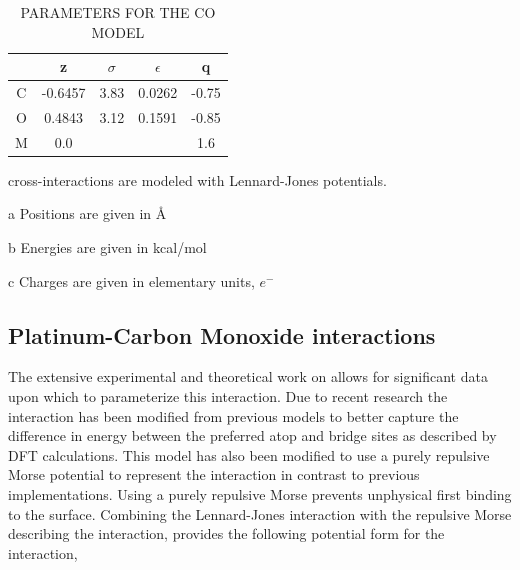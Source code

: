 \begin{table}
\caption{PARAMETERS FOR THE CO MODEL}
\centering
\begin{threeparttable}
\centering
\begin{tabular}{c c c c c}
\hline
\hline
 & z \tnote{a} & $\sigma$ \tnote{a} & $\epsilon$ \tnote{b} & q \tnote{c}\\
 \hline
 C & -0.6457 & 3.83 & 0.0262 & -0.75 \\
 O & 0.4843 & 3.12 & 0.1591 & -0.85 \\
 M & 0.0 & & & 1.6 \\
\hline
\hline
 \end{tabular}
\begin{tablenotes}
  \item {} cross-interactions are modeled with Lennard-Jones potentials.
  \item[a] Positions are given in \AA
  \item[b] Energies are given in kcal/mol
  \item[c] Charges are given in elementary units, $e^{-}$
\end{tablenotes}
\end{threeparttable}
\label{tab:parameters}
\end{table}

\subsection{Platinum-Carbon Monoxide interactions}
The extensive experimental \citep{Yeo:1997th, Ertl:1977cg, Kelemen:1979ad,
?,?,?} and theoretical \citep{Deshlahra:2012aa, Korzeniewski:1986kl,
Beurden:2002ys, Deshlahra:2009wu, Feibelman:2001qa, Mason:2004ix} work on
 allows for significant data upon which to parameterize this
interaction.  Due to recent research the  interaction has been
modified from previous models\citep{Michalka:2013aa, Michalka:2015aa} to better
capture the difference in energy between the preferred atop and bridge
sites as described by DFT calculations.\citep{Deshlahra:2012aa} This model has
also been modified to use a purely repulsive Morse potential to represent the
 interaction in contrast to previous
implementations.\citep{Korzeniewski:1986kl, Michalka:2013aa} Using a purely
repulsive Morse prevents unphysical  first binding to the surface.
Combining the Lennard-Jones  interaction with the repulsive
Morse describing the  interaction, provides the following
potential form for the  interaction,

